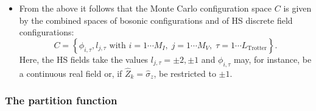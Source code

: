 \begin{itemize}
\item From the above it follows that the  Monte Carlo configuration space $C$  
is given by the combined spaces of bosonic configurations  and of HS discrete field configurations:
\begin{equation}
	C = \left\{   \phi_{i,\tau} ,  l_{j,\tau}  \text{ with }  i=1\cdots M_I,\;  j = 1\cdots M_V,\; \tau=1\cdots L_{\mathrm{Trotter}}  \right\}.
\end{equation}
Here, the HS fields take the values $l_{j,\tau} = \pm 2, \pm 1 $ and  $\phi_{i,\tau}$ may, for instance, be a continuous real field or, if $\hat{Z}_k = \hat{\sigma}_{z}$, be restricted to $\pm 1$.
\end{itemize}

\subsubsection{The partition function}\label{sec:part}

